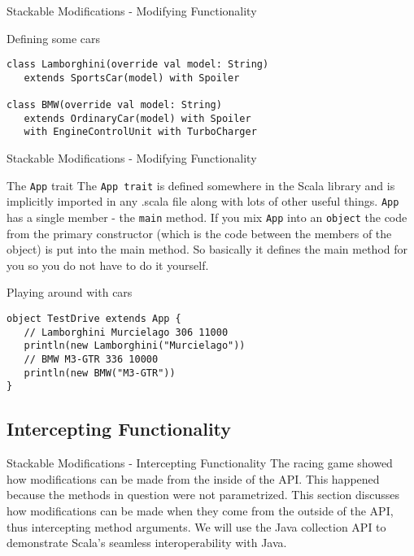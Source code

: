 \begin{frame}[fragile]{Stackable Modifications - Modifying Functionality}
\begin{exampleblock}{Defining some cars}
\begin{lstlisting}
class Lamborghini(override val model: String) 
   extends SportsCar(model) with Spoiler
  
class BMW(override val model: String)
   extends OrdinaryCar(model) with Spoiler
   with EngineControlUnit with TurboCharger
\end{lstlisting}
\end{exampleblock}
\end{frame}

\begin{frame}[fragile]{Stackable Modifications - Modifying Functionality}
\begin{block}{The \lstinline!App! trait}
The \lstinline!App trait! is defined somewhere in the Scala library and is
implicitly imported in any .scala file along with lots of other useful
things. \lstinline!App! has a single member - the \lstinline!main! method.
If you mix \lstinline!App! into an \lstinline!object! the code from the primary
constructor (which is the code between the members of the object) is put into
the main method. So basically it defines the main method for you so you do not
have to do it yourself.
\end{block}
\begin{exampleblock}{Playing around with cars}
\begin{lstlisting}
object TestDrive extends App {
   // Lamborghini Murcielago 306 11000
   println(new Lamborghini("Murcielago"))
   // BMW M3-GTR 336 10000
   println(new BMW("M3-GTR"))
}
\end{lstlisting}
\end{exampleblock}
\end{frame}

\subsection{Intercepting Functionality}
\begin{frame}{Stackable Modifications - Intercepting Functionality}
The racing game showed how modifications can be made from the inside of the API.
This happened because the methods in question were not parametrized. This
section discusses how modifications can be made when they come from the outside
of the API, thus intercepting method arguments. We will use the Java collection
API to demonstrate Scala's seamless interoperability with Java.
\end{frame}

